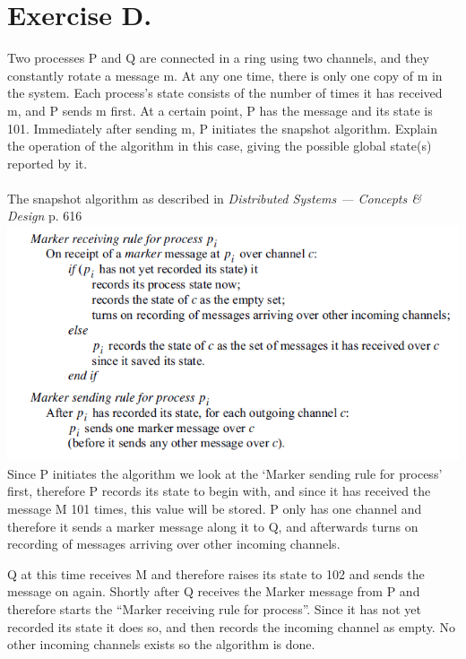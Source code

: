 \section{Exercise D.}
Two processes P and Q are connected in a ring using two channels, and they constantly rotate a message m. At any one time, there is only one copy of m in the system. Each process’s state consists of the number of times it has received m, and P sends m first. At a certain point, P has the message and its state is 101. Immediately after sending m, P initiates the snapshot algorithm. Explain the operation of the algorithm in this case, giving the possible global state(s) reported by it.\\\\
The snapshot algorithm as described in \emph{Distributed Systems — Concepts \& Design} p. 616\\

\includegraphics[scale=0.7]{Snapshot-Algorithm}\\

Since P initiates the algorithm we look at the ‘Marker sending rule for process’ first, therefore P records its state to begin with, and since it has received the message M 101 times, this value will be stored. P only has one channel and therefore it sends a marker message along it to Q, and afterwards turns on recording of messages arriving over other incoming channels.

Q at this time receives M and therefore raises its state to 102 and sends the message on again. Shortly after Q receives the Marker message from P and therefore starts the “Marker receiving rule for process”. Since it has not yet recorded its state it does so, and then records the incoming channel as empty. No other incoming channels exists so the algorithm is done.

\newpage